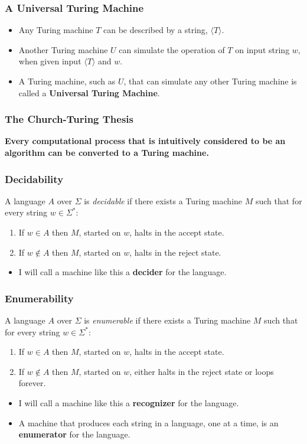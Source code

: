 \documentclass{beamer}
\newcommand{\bfr}[1]{\begin{frame}[fragile]\frametitle{{ #1 }}}
\begin{document}
\bfr{A Universal Turing Machine}
\begin{itemize}
\item Any Turing machine $T$ can be described by a string, $\langle T\rangle$.
\item Another Turing machine $U$ can simulate the operation of
  $T$ on input string $w$, when given input
  $\langle T\rangle$ and $w$.
\item A Turing machine, such as $U$,
  that can simulate any other Turing machine is
  called a {\bf Universal Turing Machine}.
\end{itemize}
\end{frame}

\bfr{The Church-Turing Thesis}

{\Large \bf
  Every computational process that is intuitively considered to
  be an algorithm can be converted to a Turing machine.  }
\end{frame}

\bfr{Decidability}

A language $A$ over $\Sigma$
is {\em decidable} if there exists a Turing machine $M$
such that for every string $w\in\Sigma^*$:
\begin{enumerate}
\item If $w\in A$ then $M$, started on $w$, halts in the accept state.
\item If $w\not\in A$ then $M$, started on $w$, halts in the reject state.
\end{enumerate}


\vfill

\begin{itemize}
  \item
I will call a machine like this a {\bf decider} for the language.
\end{itemize}
\end{frame}


\bfr{Enumerability}

A language $A$ over $\Sigma$
is {\em enumerable} if there exists a Turing machine $M$
such that for every string $w\in\Sigma^*$:
\begin{enumerate}
\item If $w\in A$ then $M$, started on $w$, halts in the accept state.
\item If $w\not\in A$ then $M$, started on $w$, either halts in the
  reject state or loops forever.
\end{enumerate}
\vfill
\begin{itemize}
\item
I will call a machine like this a {\bf recognizer} for the language.
\item
A machine that produces each string in a language, one at a time, is
an {\bf enumerator } for the language.
\end{itemize}
\end{frame}
\end{document}
